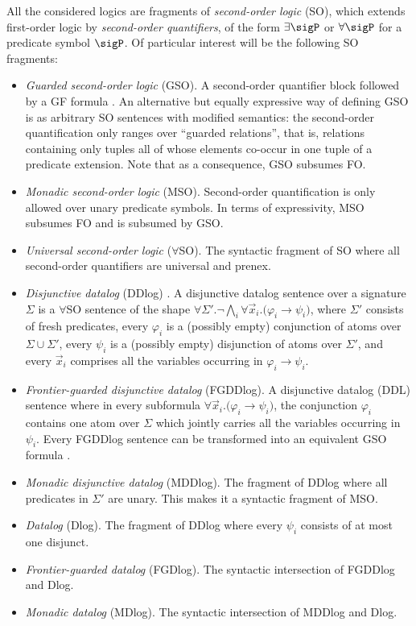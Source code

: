 \noindent All the considered logics are fragments of \emph{second-order logic} (SO), which extends first-order logic by \emph{second-order quantifiers}, of the form $\exists \sigP$ or $\forall \sigP$ for a predicate symbol $\sigP$. 
Of particular interest will be the following SO fragments:
\begin{itemize}
	\item 
	\emph{Guarded second-order logic} (GSO). A second-order quantifier block followed by a GF formula \cite{GradelHO00}. An alternative but equally expressive way of defining GSO is as arbitrary SO sentences with modified semantics: the second-order quantification only ranges over ``guarded relations'', that is, relations containing only tuples all of whose elements co-occur in one tuple of a predicate extension. Note that as a consequence, GSO subsumes FO.
	\item 
    \emph{Monadic second-order logic} (MSO). Second-order quantification is only allowed over unary predicate symbols. In terms of expressivity, MSO subsumes FO and is subsumed by GSO.
	\item 
	\emph{Universal second-order logic} ($\forall$SO). The syntactic fragment of SO where all second-order quantifiers are universal and prenex.
	\item 
    \emph{Disjunctive datalog} (DDlog) \cite{EiterGM97}. 
    A disjunctive datalog sentence over a signature $\Sigma$ is a $\forall$SO sentence of the shape 
    $\forall \Sigma'.\neg\bigwedge_i \forall \vec{x}_i. \big(\varphi_i \to \psi_i \big)$, %
    where $\Sigma'$ consists of fresh predicates, every $\varphi_i$ is a (possibly empty) conjunction of atoms over $\Sigma \cup \Sigma'$, every $\psi_i$ is a (possibly empty) disjunction of atoms over $\Sigma'$, and every $\vec{x}_i$ comprises all the variables occurring in $\varphi_i \to \psi_i$.
	\item 
    \emph{Frontier-guarded disjunctive datalog} (FGDDlog). 
    A disjunctive datalog (DDL) sentence where in every subformula $\forall \vec{x}_i. \big(\varphi_i \to \psi_i\big)$, the conjunction $\varphi_i$ contains one atom over $\Sigma$ which jointly carries all the variables occurring in $\psi_i$. Every FGDDlog sentence can be transformed into an equivalent GSO formula \cite{GradelHO00}.
    \item 
    \emph{Monadic disjunctive datalog} (MDDlog). The fragment of DDlog where all predicates in $\Sigma'$ are unary. This makes it a syntactic fragment of MSO. 
    \item 
    \emph{Datalog} (Dlog). The fragment of DDlog where every $\psi_i$ consists of at most one disjunct.
	\item 
    \emph{Frontier-guarded datalog} (FGDlog). The syntactic intersection of FGDDlog and Dlog. 
    \item 
    \emph{Monadic datalog} (MDlog). The syntactic intersection of MDDlog and Dlog.

\end{itemize}

